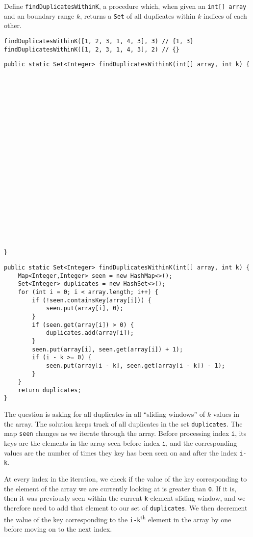 \begin{blocksection}
\question Define \lstinline$findDuplicatesWithinK$, a procedure which, when
given an \lstinline$int[] array$ and an boundary range $k$, returns a
\lstinline$Set$ of all  duplicates within $k$ indices of each other.

\begin{lstlisting}
findDuplicatesWithinK([1, 2, 3, 1, 4, 3], 3) // {1, 3}
findDuplicatesWithinK([1, 2, 3, 1, 4, 3], 2) // {}
\end{lstlisting}

\ifprintanswers\else
\begin{lstlisting}
public static Set<Integer> findDuplicatesWithinK(int[] array, int k) {






















}
\end{lstlisting}
\fi

\begin{solution}
\begin{lstlisting}
public static Set<Integer> findDuplicatesWithinK(int[] array, int k) {
    Map<Integer,Integer> seen = new HashMap<>();
    Set<Integer> duplicates = new HashSet<>();
    for (int i = 0; i < array.length; i++) {
        if (!seen.containsKey(array[i])) {
            seen.put(array[i], 0);
        }
        if (seen.get(array[i]) > 0) {
            duplicates.add(array[i]);
        }
        seen.put(array[i], seen.get(array[i]) + 1);
        if (i - k >= 0) {
            seen.put(array[i - k], seen.get(array[i - k]) - 1);
        }
    }
    return duplicates;
}
\end{lstlisting}

The question is asking for all duplicates in all ``sliding windows'' of $k$
values in the array. The solution keeps track of all duplicates in the set
\lstinline$duplicates$. The map \lstinline$seen$ changes as we iterate through
the array. Before processing index \lstinline$i$, its keys are the elements in
the array seen before index \lstinline$i$, and the corresponding values are the
number of times they key has been seen on and after the index \lstinline$i-k$.

At every index in the iteration, we check if the value of the key corresponding
to the element of the array we are currently looking at is greater than
\lstinline$0$. If it is, then it was previously seen within the current
\lstinline$k$-element sliding window, and we therefore need to add that element
to our set of \lstinline$duplicates$. We then decrement the value of the key
corresponding to the \lstinline$i-k$\textsuperscript{th} element in the array
by one before moving on to the next index.
\end{solution}
\end{blocksection}
